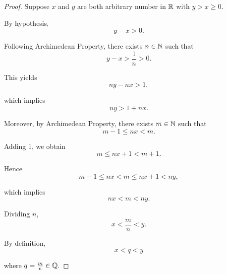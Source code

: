 \subsubsection{}
\begin{proof}
    Suppose $x$ and $y$ are both arbitrary number in $\mathbb{R}$ with $y > x \geq 0$. 
    
    By hypothesis, 
    \begin{equation*}
        y - x > 0. 
    \end{equation*}

    Following Archimedean Property, there exists $n \in \mathbb{N}$ such that 
    \begin{equation*}
        y - x > \frac{1}{n} > 0. 
    \end{equation*}

    This yields
    \begin{equation*}
        ny - nx > 1,  
    \end{equation*}

    which implies 
    \begin{equation*}
        ny > 1 + nx. 
    \end{equation*}

    Moreover, by Archimedean Property, there exists $m \in \mathbb{N}$ such that  
    \begin{equation*}
        m - 1 \leq nx < m. 
    \end{equation*}

    Adding $1$, we obtain
    \begin{equation*}
        m \leq nx + 1 < m + 1. 
    \end{equation*}

    Hence 
    \begin{equation*}
        m - 1 \leq nx < m  \leq nx + 1 < ny, 
    \end{equation*}

    which implies 
    \begin{equation*}
        nx < m < ny. 
    \end{equation*}

    Dividing $n$, 
    \begin{equation*}
        x < \frac{m }{n} < y. 
    \end{equation*}

    By definition, 
    \begin{equation*}
        x < q < y   
    \end{equation*}

    where $q = \frac{m }{n } \in \mathbb{Q}$. 


\end{proof}
